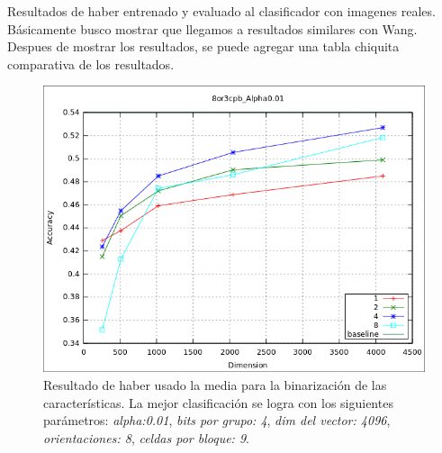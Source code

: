 	Resultados de haber entrenado y evaluado al clasificador con imagenes reales. Básicamente busco mostrar que llegamos a resultados similares con Wang. Despues de mostrar los resultados, se puede agregar una tabla chiquita comparativa de los resultados.
	
			\begin{figure}[htbp!]
				\centering
				\includegraphics[scale=0.6]{img/resultados/reales/media_8or3cpb_Alpha0,01.png}
				\caption[Reales con umbral media]{Resultado de haber usado la media para la binarización de las características. La mejor clasificación se logra con los siguientes parámetros: \textit{alpha:0.01}, \textit{bits por grupo: 4}, \textit{dim del vector: 4096}, \textit{orientaciones: 8}, \textit{celdas por bloque: 9}.}
				\label{fig: Reales-media-8or9cpbAlph0.01}
			\end{figure}
			
